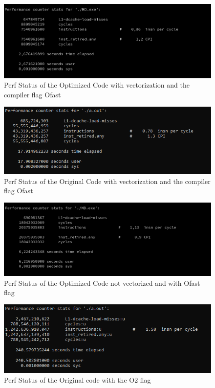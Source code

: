 \documentclass[conference]{IEEEtran}
\begin{document}
\begin{figure}[htbp]
\includegraphics[scale=0.6]{images/2.6.png}
\caption{Perf Status of the Optimized Code with vectorization and the compiler flag Ofast}
\label{fig}
\end{figure}

\begin{figure}[htbp]
\includegraphics[scale=0.9]{images/ofasstpoooog.png}
\caption{Perf Status of the Original Code with vectorization and the compiler flag Ofast}
\label{fig}
\end{figure}

\begin{figure}[htbp]
\includegraphics[scale=0.6]{images/Good_code_not_vectorized.png}
\caption{Perf Status of the Optimized Code not vectorized and with Ofast flag}
\label{fig}
\end{figure}

\begin{figure}[htbp]
\includegraphics[scale=0.9]{images/deu200.png}
\caption{Perf Status of the Original code with the O2 flag}
\label{fig}
\end{figure}
\end{document}

